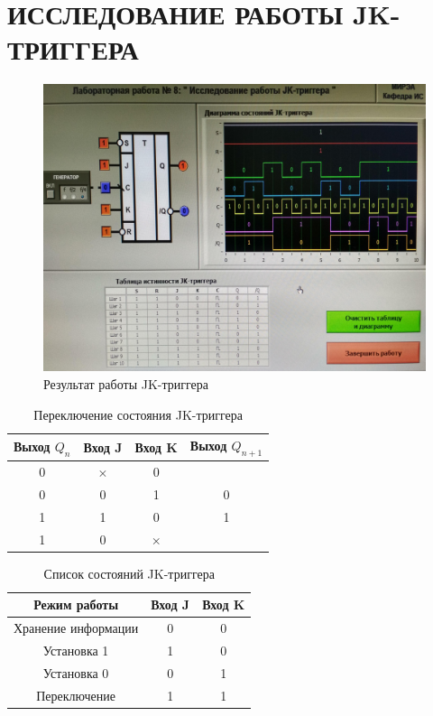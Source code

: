 \section{ИССЛЕДОВАНИЕ РАБОТЫ JK-ТРИГГЕРА}

\begin{figure}[H]
	\centering
	\includegraphics[width=0.95\linewidth]{imgs/8/1}
	\caption{Результат работы JK-триггера}
	\label{fig:8_1}
\end{figure}

\begin{table}[H]
	\centering
	\caption{Переключение состояния JK-триггера}
	\label{tab:lab_08_states}
	\begin{tabular}{|c|c|c|c|}
		\hline
		Выход $Q_n$ & Вход J   & Вход K   & Выход $Q_{n+1}$ \\ \hline
		0           & $\times$ & 0        &                 \\ \hline
		0           & 0        & 1        & 0               \\ \hline
		1           & 1        & 0        & 1               \\ \hline
		1           & 0        & $\times$ &                 \\ \hline
	\end{tabular}
\end{table}

\begin{table}[H]
	\centering
	\caption{Список состояний JK-триггера}
	\label{tab:lab_08_mode}
	\begin{tabular}{|c|c|c|}
		\hline
		Режим работы        & Вход J & Вход K \\ \hline
		Хранение информации & 0      & 0      \\ \hline
		Установка 1         & 1      & 0      \\ \hline
		Установка 0         & 0      & 1      \\ \hline
		Переключение        & 1      & 1      \\ \hline
	\end{tabular}
\end{table}

